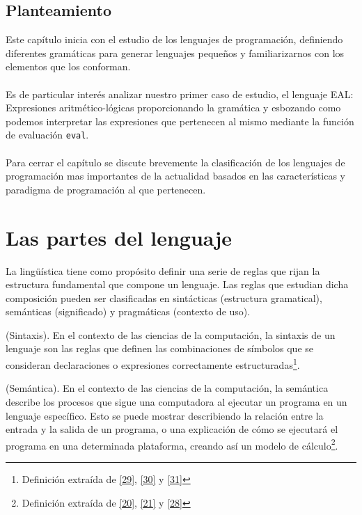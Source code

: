 \subsection*{Planteamiento}
    Este capítulo inicia con el estudio de los lenguajes de programación, definiendo diferentes gramáticas para generar lenguajes pequeños y familiarizarnos con los elementos que los conforman.\\\\
    Es de particular interés analizar nuestro primer caso de estudio, el lenguaje \textsf{EAL}: Expresiones aritmético-lógicas proporcionando la gramática y esbozando como podemos interpretar las expresiones que pertenecen al mismo mediante la función de evaluación \texttt{eval}.\\\\
    Para cerrar el capítulo se discute brevemente la clasificación de los lenguajes de programación mas importantes de la actualidad basados en las características y paradigma de programación al que pertenecen. 

\section{Las partes del lenguaje}

    La lingüística tiene como propósito definir una serie de reglas que rijan la estructura fundamental que compone un lenguaje.
Las reglas que estudian dicha composición pueden ser clasificadas en sintácticas (estructura gramatical), semánticas (significado) y pragmáticas (contexto de uso).\\

    \begin{definition}(Sintaxis).
        En el contexto de las ciencias de la computación, la sintaxis de un lenguaje son las reglas que definen las combinaciones de símbolos que se consideran declaraciones o expresiones correctamente estructuradas\footnote{Definición extraída de  \hyperlink{29}{[29]}, \hyperlink{30}{[30]} y \hyperlink{31}{[31]}}.
        
    \end{definition}

\bigskip

    \begin{definition}(Semántica).
        En el contexto de las ciencias de la computación, la semántica describe los procesos que sigue una computadora al ejecutar un programa en un lenguaje específico. Esto se puede mostrar describiendo la relación entre la entrada y la salida de un programa, o una explicación de cómo se ejecutará el programa en una determinada plataforma, creando así un modelo de cálculo\footnote{Definición extraída de \hyperlink{20}{[20]},  \hyperlink{21}{[21]} y \hyperlink{28}{[28]}}.
    \end{definition} 


